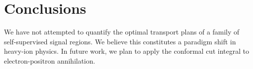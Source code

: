\section{Conclusions}\label{sec:conclusions}

We have not attempted to quantify the optimal transport plans of a
family of self-supervised signal regions. We believe this constitutes a
paradigm shift in heavy-ion physics. In future work, we plan to apply
the conformal cut integral to electron-positron annihilation.

